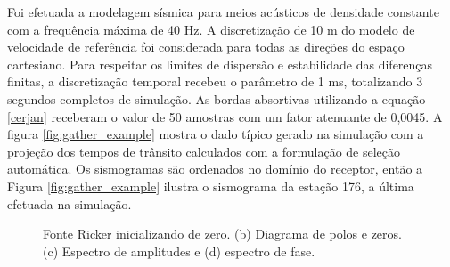 Foi efetuada a modelagem sísmica para meios acústicos de densidade constante com a frequência máxima de 40 Hz. A discretização de 10 m do modelo de velocidade de referência foi considerada para todas as direções do espaço cartesiano. Para respeitar os limites de dispersão e estabilidade das diferenças finitas, a discretização temporal recebeu o parâmetro de 1 ms, totalizando 3 segundos completos de simulação. As bordas absortivas utilizando a equação \ref{cerjan} receberam o valor de 50 amostras com um fator atenuante de 0,0045. A figura \ref{fig:gather_example} mostra o dado típico gerado na simulação com a projeção dos tempos de trânsito calculados com a formulação de seleção automática. Os sismogramas são ordenados no domínio do receptor, então a Figura \ref{fig:gather_example} ilustra o sismograma da estação 176, a última efetuada na simulação.     

\begin{figure}[H]
	\centering
	
	
	\caption{Fonte Ricker inicializando de zero. (b) Diagrama de polos e zeros. (c) Espectro de amplitudes e (d) espectro de fase.}
	\label{fig:ricker_min_phase}
\end{figure}

